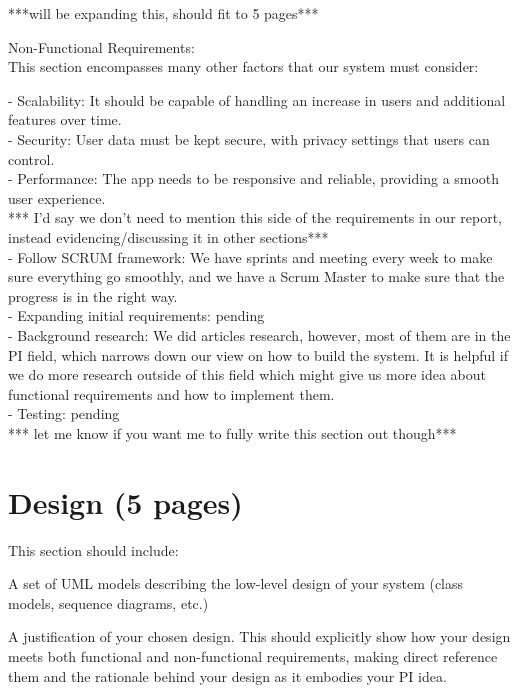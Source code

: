 \documentclass[12pt]{article}
\begin{document}
***will be expanding this, should fit to 5 pages***

Non-Functional Requirements: \\ 

This section encompasses many other factors that our system must consider:

-    Scalability: It should be capable of handling an increase in users and additional features over time.\\

-    Security: User data must be kept secure, with privacy settings that users can control.\\

-    Performance: The app needs to be responsive and reliable, providing a smooth user experience.\\


*** I'd say we don't need to mention this side of the requirements in our report, instead evidencing/discussing it in other sections***\\

-    Follow SCRUM framework: We have sprints and meeting every week to make sure everything go smoothly, and we have a Scrum Master to make sure that the progress is in the right way.\\

-    Expanding initial requirements: pending\\

-    Background research: We did articles research, however, most of them are in the PI field, which narrows down our view on how to build the system. It is helpful if we do more research outside of this field which might give us more idea about functional requirements and how to implement them.\\

-       Testing: pending\\

*** let me know if you want me to fully write this section out though***



\section{Design (5 pages)}

This section should include:

A set of UML models describing the low-level design of your system (class models,
sequence diagrams, etc.)

A justification of your chosen design. This should explicitly show how your design
meets both functional and non-functional requirements, making direct reference
them and the rationale behind your design as it embodies your PI idea.
\end{document}
